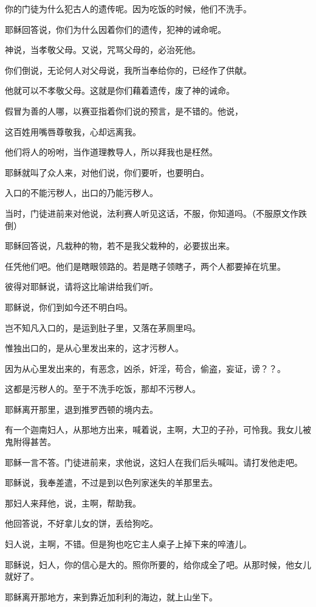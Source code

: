 \documentclass[12pt,oneside]{book}
\begin{document}
你的门徒为什么犯古人的遗传呢。因为吃饭的时候，他们不洗手。

耶稣回答说，你们为什么因着你们的遗传，犯神的诫命呢。

神说，当孝敬父母。又说，咒骂父母的，必治死他。

你们倒说，无论何人对父母说，我所当奉给你的，已经作了供献。

他就可以不孝敬父母。这就是你们藉着遗传，废了神的诫命。

假冒为善的人哪，以赛亚指着你们说的预言，是不错的。他说，

这百姓用嘴唇尊敬我，心却远离我。

他们将人的吩咐，当作道理教导人，所以拜我也是枉然。

耶稣就叫了众人来，对他们说，你们要听，也要明白。

入口的不能污秽人，出口的乃能污秽人。

当时，门徒进前来对他说，法利赛人听见这话，不服，你知道吗。（不服原文作跌倒）

耶稣回答说，凡栽种的物，若不是我父栽种的，必要拔出来。

任凭他们吧。他们是瞎眼领路的。若是瞎子领瞎子，两个人都要掉在坑里。

彼得对耶稣说，请将这比喻讲给我们听。

耶稣说，你们到如今还不明白吗。

岂不知凡入口的，是运到肚子里，又落在茅厕里吗。

惟独出口的，是从心里发出来的，这才污秽人。

因为从心里发出来的，有恶念，凶杀，奸淫，苟合，偷盗，妄证，谤？？。

这都是污秽人的。至于不洗手吃饭，那却不污秽人。

耶稣离开那里，退到推罗西顿的境内去。

有一个迦南妇人，从那地方出来，喊着说，主啊，大卫的子孙，可怜我。我女儿被鬼附得甚苦。

耶稣一言不答。门徒进前来，求他说，这妇人在我们后头喊叫。请打发他走吧。

耶稣说，我奉差遣，不过是到以色列家迷失的羊那里去。

那妇人来拜他，说，主啊，帮助我。

他回答说，不好拿儿女的饼，丢给狗吃。

妇人说，主啊，不错。但是狗也吃它主人桌子上掉下来的啐渣儿。

耶稣说，妇人，你的信心是大的。照你所要的，给你成全了吧。从那时候，他女儿就好了。

耶稣离开那地方，来到靠近加利利的海边，就上山坐下。
\end{document}
